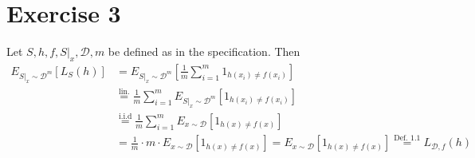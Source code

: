 \documentclass[12pt]{article}
\begin{document}
\section*{Exercise 3}
Let $S,h,f,S|_x, \mathcal{D},m $ be defined as in the specification. Then
\begin{align*}
	E_{S|_x \sim \mathcal{D}^m}[L_S(h)] &=E_{S|_x \sim \mathcal{D}^m} \left[ \frac{1}{m} \sum_{i=1}^m 1_{h(x_i) \neq f(x_i)} \right] \\
	&\overset{\text{lin.}}{=} \frac{1}{m} \sum_{i=1}^m E_{S|_x \sim \mathcal{D}^m} \left[ 1_{h(x_i) \neq f(x_i)}\right] \\
	&\overset{\text{i.i.d}}{=}\frac{1}{m} \sum_{i=1}^m E_{x \sim \mathcal{D}} \left[ 1_{h(x) \neq f(x)}\right] \\
	&=  \frac{1}{m} \cdot m \cdot  E_{x \sim \mathcal{D}} \left[ 1_{h(x) \neq f(x)}\right] =  E_{x \sim \mathcal{D}} \left[ 1_{h(x) \neq f(x)}\right] \overset{\text{Def. 1.1}}{=} L_{\mathcal{D},f}(h)
\end{align*}
\end{document}
